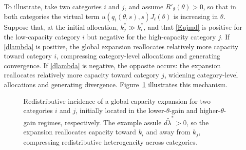 \documentclass{class}
\begin{document}
To illustrate, take two categories \(i\) and \(j\), and assume \(R'_\theta(\theta)>0\), so that in both categories the virtual term \(u(q_i(\theta,s),s)J_i(\theta)\) is increasing in \(\theta\). Suppose that, at the initial allocation, \(k_j^\ast \gg k_i^\ast\), and that \ref{Eujmd} is positive for the low-capacity category \(i\) but negative for the high-capacity category \(j\). If \ref{dlambda} is positive, the global expansion reallocates relatively more capacity toward category \(i\), compressing category-level allocations and generating convergence. If \ref{dlambda} is negative, the opposite occurs: the expansion reallocates relatively more capacity toward category \(j\), widening category-level allocations and generating divergence. Figure~\ref{fig:general_surplus} illustrates this mechanism.

\begin{figure}
\centering
{}

\caption{Redistributive incidence of a global capacity expansion for two categories \(i\) and \(j\), initially located in the lower-\(\theta\)-gain and higher-\(\theta\)-gain regimes, respectively. The example assule \(d\tilde\lambda^\ast>0\), so the expansion reallocates capacity toward \(k_i\) and away from \(k_j\), compressing redistributive heterogeneity across categories.}
\label{fig:general_surplus}
\end{figure}
\end{document}
